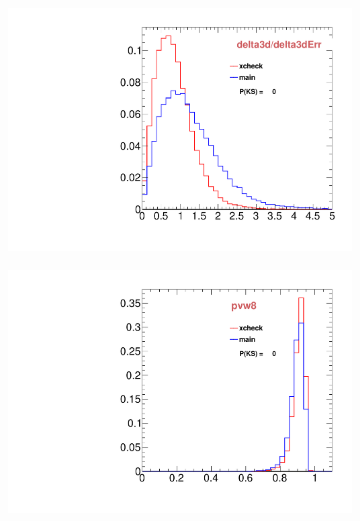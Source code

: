 \begin{figure}
\begin{subfigure}[b]{0.2\textwidth}
                \includegraphics[width=\textwidth]{Figures/VariablesComparison/MC_barrel_figs/pvips}
                \label{fig:MC_barrel_pvips}
        \end{subfigure}
        \begin{subfigure}[b]{0.2\textwidth}
                \centering
                \includegraphics[width=\textwidth]{Figures/VariablesComparison/MC_barrel_figs/pvw8}
                \label{fig:MC_barrel_pvw8}
        \end{subfigure}
        \begin{subfigure}[b]{0.2\textwidth}
                \centering

\end{subfigure}
\end{figure}
